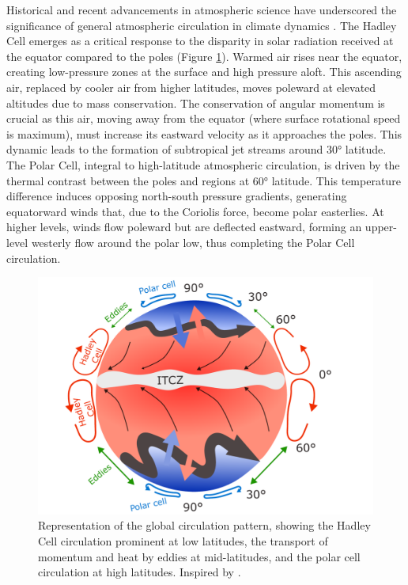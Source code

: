 Historical and recent advancements in atmospheric science have underscored the significance of general atmospheric circulation in climate dynamics \citep{lorenz1967nature, hadley1735vi, stull2015practical, schneider2006general}. The Hadley Cell emerges as a critical response to the disparity in solar radiation received at the equator compared to the poles (Figure \ref{global_circulation}). Warmed air rises near the equator, creating low-pressure zones at the surface and high pressure aloft. This ascending air, replaced by cooler air from higher latitudes, moves poleward at elevated altitudes due to mass conservation. The conservation of angular momentum is crucial as this air, moving away from the equator (where surface rotational speed is maximum), must increase its eastward velocity as it approaches the poles. This dynamic leads to the formation of subtropical jet streams around 30° latitude. The Polar Cell, integral to high-latitude atmospheric circulation, is driven by the thermal contrast between the poles and regions at 60° latitude. This temperature difference induces opposing north-south pressure gradients, generating equatorward winds that, due to the Coriolis force, become polar easterlies. At higher levels, winds flow poleward but are deflected eastward, forming an upper-level westerly flow around the polar low, thus completing the Polar Cell circulation.

\begin{figure}[h!]
\begin{center}
\setcaptionmargin{1cm}
\includegraphics[width=0.9\columnwidth,angle=0]{fig/global_circulation.pdf}
\caption[Global Circulation]{Representation of the global circulation pattern, showing the Hadley Cell circulation prominent at low latitudes, the transport of momentum and heat by eddies at mid-latitudes, and the polar cell circulation at high latitudes. Inspired by \citet{stull2015practical}.}
\label{global_circulation}
\end{center}
\end{figure}


